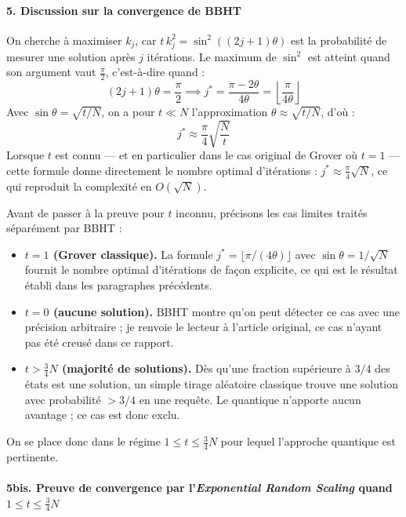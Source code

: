 \documentclass{ceri/sty/rapport}
\begin{document}
\paragraph{5. Discussion sur la convergence de BBHT}
On cherche à maximiser $k_j$, car $t\,k_j^2 = \sin^2((2j+1)\theta)$ est la probabilité de mesurer une solution après $j$ itérations. Le maximum de $\sin^2$ est atteint quand son argument vaut $\frac{\pi}{2}$, c'est-à-dire quand :
\[
(2j+1)\theta = \frac{\pi}{2} \implies j^* = \frac{\pi - 2\theta}{4\theta} = \left\lfloor\frac{\pi}{4\theta}\right\rfloor
\]
Avec $\sin\theta = \sqrt{t/N}$, on a pour $t \ll N$ l'approximation $\theta \approx \sqrt{t/N}$, d'où :
\[
j^* \approx \frac{\pi}{4}\sqrt{\frac{N}{t}}
\]
Lorsque $t$ est connu --- et en particulier dans le cas original de Grover où $t = 1$ --- cette formule donne directement le nombre optimal d'itérations : $j^* \approx \frac{\pi}{4}\sqrt{N}$, ce qui reproduit la complexité en $O(\sqrt{N})$.

\medskip
Avant de passer à la preuve pour $t$ inconnu, précisons les cas limites traités séparément par BBHT :

\begin{itemize}
  \item \textbf{$t = 1$ (Grover classique).} La formule $j^* = \lfloor \pi/(4\theta) \rfloor$ avec $\sin\theta = 1/\sqrt{N}$ fournit le nombre optimal d'itérations de façon explicite, ce qui est le résultat établi dans les paragraphes précédents.
  \item \textbf{$t = 0$ (aucune solution).} BBHT montre qu'on peut détecter ce cas avec une précision arbitraire ; je renvoie le lecteur à l'article original, ce cas n'ayant pas été creusé dans ce rapport.
  \item \textbf{$t > \frac{3}{4}N$ (majorité de solutions).} Dès qu'une fraction supérieure à $3/4$ des états est une solution, un simple tirage aléatoire classique trouve une solution avec probabilité $> 3/4$ en une requête. Le quantique n'apporte aucun avantage ; ce cas est donc exclu.
\end{itemize}

\noindent On se place donc dans le régime $1 \le t \le \frac{3}{4}N$ pour lequel l'approche quantique est pertinente.

\paragraph{5bis. Preuve de convergence par l'\emph{Exponential Random Scaling} quand $1 \le t \le \frac{3}{4}N$}
\end{document}
